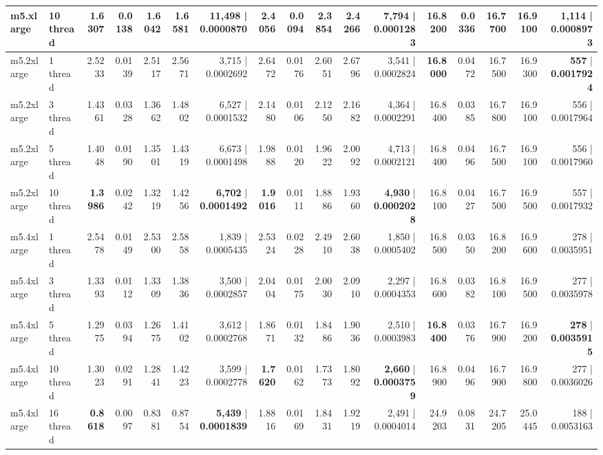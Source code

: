 \documentclass[conference]{IEEEtran}
\begin{document}
\begin{table}[h]
{\begin{tabular}{ll|rrrrr|rrrrr|rrrrr}
			m5.xlarge & 10 thread & 1.6307 & 0.0138 & 1.6042 & 1.6581 & 11,498 | 0.0000870 & \textbf{2.4056} & 0.0094 & 2.3854 & 2.4266 & \textbf{7,794} | \textbf{0.0001283} & 16.8200 & 0.0336 & 16.7700 & 16.9100 & 1,114 | 0.0008973 \\
			\midrule
			m5.2xlarge & 1 thread & 2.5233 & 0.0139 & 2.5117 & 2.5671 & 3,715 | 0.0002692 & 2.6472 & 0.0176 & 2.6051 & 2.6796 & 3,541 | 0.0002824 & \textbf{16.8000} & 0.0472 & 16.7500 & 16.9300 & \textbf{557} | \textbf{0.0017924} \\
			m5.2xlarge & 3 thread & 1.4361 & 0.0328 & 1.3662 & 1.4802 & 6,527 | 0.0001532 & 2.1480 & 0.0106 & 2.1250 & 2.1682 & 4,364 | 0.0002291 & 16.8400 & 0.0385 & 16.7800 & 16.9100 & 556 | 0.0017964 \\
			m5.2xlarge & 5 thread & 1.4048 & 0.0190 & 1.3501 & 1.4319 & 6,673 | 0.0001498 & 1.9888 & 0.0120 & 1.9622 & 2.0092 & 4,713 | 0.0002121 & 16.8400 & 0.0496 & 16.7500 & 16.9100 & 556 | 0.0017960 \\
			m5.2xlarge & 10 thread & \textbf{1.3986} & 0.0242 & 1.3219 & 1.4256 & \textbf{6,702} | \textbf{0.0001492} & \textbf{1.9016} & 0.0111 & 1.8886 & 1.9360 & \textbf{4,930} | \textbf{0.0002028} & 16.8100 & 0.0427 & 16.7500 & 16.9500 & 557 | 0.0017932 \\
			\midrule
			m5.4xlarge & 1 thread & 2.5478 & 0.0149 & 2.5300 & 2.5858 & 1,839 | 0.0005435 & 2.5324 & 0.0228 & 2.4910 & 2.6038 & 1,850 | 0.0005402 & 16.8500 & 0.0350 & 16.8200 & 16.9600 & 278 | 0.0035951 \\
			m5.4xlarge & 3 thread & 1.3393 & 0.0112 & 1.3309 & 1.3836 & 3,500 | 0.0002857 & 2.0404 & 0.0175 & 2.0030 & 2.0910 & 2,297 | 0.0004353 & 16.8600 & 0.0382 & 16.8100 & 16.9500 & 277 | 0.0035978 \\
			m5.4xlarge & 5 thread & 1.2975 & 0.0394 & 1.2675 & 1.4102 & 3,612 | 0.0002768 & 1.8671 & 0.0132 & 1.8486 & 1.9036 & 2,510 | 0.0003983 & \textbf{16.8400} & 0.0376 & 16.7900 & 16.9200 & \textbf{278} | \textbf{0.0035915} \\
			m5.4xlarge & 10 thread & 1.3023 & 0.0291 & 1.2841 & 1.4223 & 3,599 | 0.0002778 & \textbf{1.7620} & 0.0162 & 1.7373 & 1.8092 & \textbf{2,660} | \textbf{0.0003759} & 16.8900 & 0.0496 & 16.7900 & 16.9800 & 277 | 0.0036026 \\
			m5.4xlarge & 16 thread & \textbf{0.8618} & 0.0097 & 0.8381 & 0.8754 & \textbf{5,439} | \textbf{0.0001839} & 1.8816 & 0.0169 & 1.8431 & 1.9219 & 2,491 | 0.0004014 & 24.9203 & 0.0831 & 24.7205 & 25.0445 & 188 | 0.0053163 \\
			\midrule\midrule

\end{tabular}}
\end{table}
\end{document}
